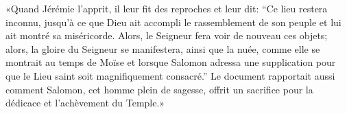 «Quand Jérémie l’apprit, il leur fit des reproches et leur dit:
	“Ce lieu restera inconnu,
	jusqu’à ce que Dieu ait accompli le rassemblement de son peuple
	et lui ait montré sa miséricorde.
Alors, le Seigneur fera voir de nouveau ces objets;
	alors, la gloire du Seigneur se manifestera, ainsi que la nuée,
		comme elle se montrait au temps de Moïse
	et lorsque Salomon adressa une supplication
		pour que le Lieu saint soit magnifiquement consacré.”
Le document rapportait aussi comment Salomon, cet homme plein de sagesse,
	offrit un sacrifice pour la dédicace et l’achèvement du Temple.»
